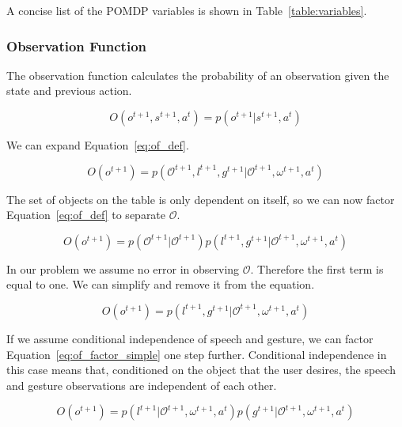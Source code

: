 \documentclass[letterpaper]{article}
\newcommand{\stnote}[1]{\textcolor{blue}{\textbf{ST: #1}}}
\begin{document}
A concise list of the POMDP variables is shown in Table~\ref{table:variables}.

\subsubsection{Observation Function}

The observation function calculates the probability of an observation given the state and previous action. 

\begin{equation}\label{eq:of_def}
O(o^{t+1},s^{t+1},a^t) = p(o^{t+1}|s^{t+1},a^t)
\end{equation}

We can expand Equation~\ref{eq:of_def}.



\begin{equation}\label{eq:of_factor}
	O(o^{t+1}) = p(\mathcal{O}^{t+1},l^{t+1}, g^{t+1}|\mathcal{O}^{t+1},\omega^{t+1}, a^t)
\end{equation}

The set of objects on the table is only dependent on itself, so we can now factor Equation~\ref{eq:of_def} to separate $\mathcal{O}$.

\begin{equation}\label{eq:of_factor2}
O(o^{t+1}) = p(\mathcal{O}^{t+1}|\mathcal{O}^{t+1})p(l^{t+1}, g^{t+1}|\mathcal{O}^{t+1},\omega^{t+1}, a^t)
\end{equation}

In our problem we assume no error in observing $\mathcal{O}$. Therefore the first term is equal to one. We can simplify and remove it from the equation.

\begin{equation}\label{eq:of_factor_simple}
O(o^{t+1}) = p(l^{t+1}, g^{t+1}|\mathcal{O}^{t+1},\omega^{t+1},a^t)
\end{equation}

If we assume conditional independence of speech and gesture, we can factor
Equation~\ref{eq:of_factor_simple} one step further.  Conditional independence
in this case means that, conditioned on the object that the user desires, the
speech and gesture observations are independent of each other. 

\begin{equation}
	O(o^{t+1}) = p(l^{t+1}|\mathcal{O}^{t+1},\omega^{t+1},a^t)p(g^{t+1}|\mathcal{O}^{t+1},\omega^{t+1},a^t)
\end{equation}
\end{document}
